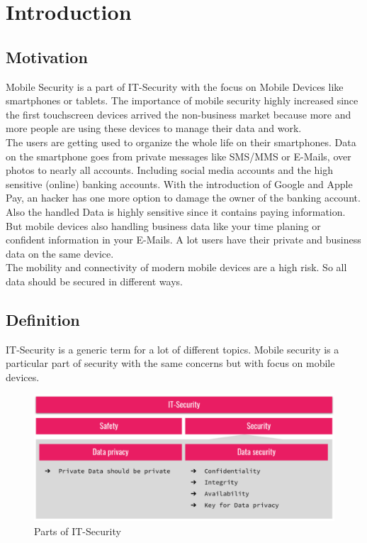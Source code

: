 \chapter{Introduction}
\label{chp:intro}

\section{Motivation}
\label{chp:intro:sec:motivation}

Mobile Security is a part of IT-Security with the focus on Mobile Devices like smartphones or tablets. The importance of mobile security highly increased since the first touchscreen devices arrived the non-business market because more and more people are using these devices to manage their data and work. \\
The users are getting used to organize the whole life on their smartphones. Data on the smartphone goes from private messages like SMS/MMS or E-Mails, over photos to nearly all accounts. Including social media accounts and the high sensitive (online) banking accounts. With the introduction of Google and Apple Pay, an hacker has one more option to damage the owner of the banking account. Also the handled Data is highly sensitive since it contains paying information.\\
But mobile devices also handling business data like your time planing or confident information in your E-Mails. A lot users have their private and business data on the same device.\\
The mobility and connectivity of modern mobile devices are a high risk. So all data should be secured in different ways.

\newpage

\section{Definition}
\label{chp:intro:sec:definition}

IT-Security is a generic term for a lot of different topics. Mobile security is a particular part of security with the same concerns but with focus on mobile devices.

\begin{figure}[h]
	\includegraphics[width=\textwidth, angle=0]{img/it_security.pdf}
		\caption{Parts of IT-Security}
	\label{img:part_it_security}
\end{figure}

